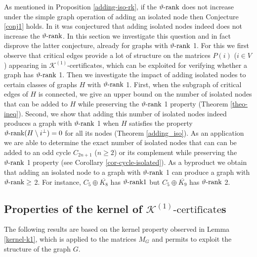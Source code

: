 \documentclass[11pt]{article}
\newcommand{\konec}{\MK^{(1)}\text{-certificate}}
\numberwithin{equation}{section}
\newcommand{\MK}{{\mathcal K}}
\newcommand{\rrank}{\vartheta\text{\rm -rank}}
\begin{document}
As mentioned in Proposition \ref{adding-iso-rk}, if the $\rrank$ does not increase under the simple graph operation of adding an isolated node then Conjecture \ref{conj1}  holds. In \cite{GL2007} it was conjectured that adding isolated nodes indeed does not increase the $\rrank$. In this section we investigate this question and in fact disprove the latter conjecture, already for graphs with $\rrank$ 1.
For this we first  observe that critical edges provide a lot of structure on the matrices $P(i)$ ($i\in V$) appearing in $\konec$s, which can be exploited for verifying whether a graph has $\rrank$ 1. Then we investigate the impact of adding isolated nodes to certain classes of graphs $H$ with $\rrank$ 1.  First, when the subgraph of critical edges of $H$ is connected, we give an upper bound on the number of isolated nodes that can be added to $H$ while preserving the $\rrank$ 1 property (Theorem \ref{theo-ineq}). Second, we show that adding this number of isolated nodes indeed produces a graph with $\rrank$ 1 when $H$ satisfies the property $\rrank(H\setminus i^\perp)=0$ for all its nodes (Theorem \ref{adding_iso}).
 As an application 
 we are able to determine the exact number of isolated nodes that can can be added to an odd cycle $C_{2n+1}$ ($n\ge 2$) or its complement while preserving the $\rrank$ 1 property (see Corollary \ref{cor-cycle-isolated}). 
As a byproduct  we obtain that  adding an isolated node to a graph with $\rrank$ 1 can produce  a graph with  $\rrank \geq $ 2. For instance, $C_5\oplus \overline {K_8}$ has $\rrank 1$ but $C_5\oplus \overline{K_{9}}$ has $\rrank$ 2.



\subsection{Properties of the kernel of $\konec$s }
 The following results are based on the kernel property observed in Lemma \ref{kernel-k1}, which is applied to the matrices $M_G$ and permits to exploit the structure of the graph $G$.
\end{document}
